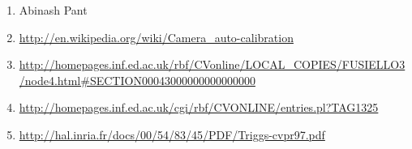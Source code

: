 \documentclass{article}
\begin{document}
\begin{enumerate}
	\item Abinash Pant
	\item \url{http://en.wikipedia.org/wiki/Camera_auto-calibration}
	\item \url{http://homepages.inf.ed.ac.uk/rbf/CVonline/LOCAL_COPIES/FUSIELLO3/node4.html#SECTION00043000000000000000}
	\item \url{http://homepages.inf.ed.ac.uk/cgi/rbf/CVONLINE/entries.pl?TAG1325}
	\item \url{http://hal.inria.fr/docs/00/54/83/45/PDF/Triggs-cvpr97.pdf}
\end{enumerate}
\end{document}
